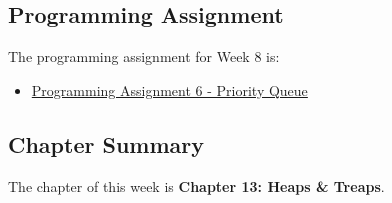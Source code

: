 \subsection{Programming Assignment}

The programming assignment for Week 8 is:

\begin{itemize}
    \item \href{https://github.com/QuantumCompiler/CU/tree/main/CSPB%202270%20-%20Data%20Structures/Assignments/Assignment%206%20-%20Priority%20Queue}{Programming Assignment 6 - Priority Queue}
\end{itemize}

\subsection{Chapter Summary}

The chapter of this week is \textbf{Chapter 13: Heaps \& Treaps}.

